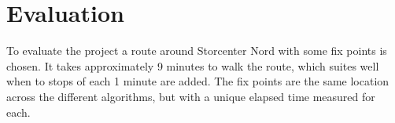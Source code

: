 \section{Evaluation}
To evaluate the project a route around Storcenter Nord with some fix points is chosen. It takes approximately 9 minutes to walk the route, which suites well when to stops of each 1 minute are added. The fix points are the same location across the different algorithms, but with a unique elapsed time measured for each.





